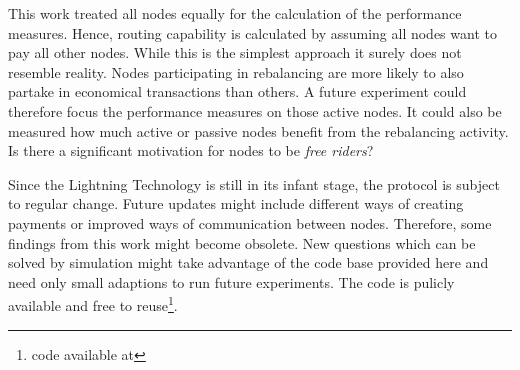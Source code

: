 \documentclass[final]{fhnwreport}       %
\begin{document}
This work treated all nodes equally for the calculation of the performance measures. Hence, routing capability is calculated by assuming all nodes want to pay all other nodes. While this is the simplest approach it surely does not resemble reality. Nodes participating in rebalancing are more likely to also partake in economical transactions than others. A future experiment could therefore focus the performance measures on those active nodes. It could also be measured how much active or passive nodes benefit from the rebalancing activity. Is there a significant motivation for nodes to be \emph{free riders}?

Since the Lightning Technology is still in its infant stage, the protocol is subject to regular change. Future updates might include different ways of creating payments or improved ways of communication between nodes. Therefore, some findings from this work might become obsolete. New questions which can be solved by simulation might take advantage of the code base provided here and need only small adaptions to run future experiments. The code is pulicly available and free to reuse\footnote{code available at \githubsim}.

\newpage
{\sloppypar
\printbibliography[heading=bibintoc]
\label{sec:lit}
}

\newpage
\listoffigures

\listoftables

\newpage








\end{document}
